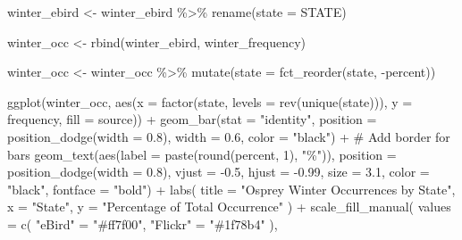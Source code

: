 \documentclass[
  letterpaper,
  DIV=11,
  numbers=noendperiod]{scrartcl}
\newenvironment{Shaded}{\begin{snugshade}}{\end{snugshade}}
\newcommand{\AttributeTok}[1]{\textcolor[rgb]{0.40,0.45,0.13}{#1}}
\newcommand{\CommentTok}[1]{\textcolor[rgb]{0.37,0.37,0.37}{#1}}
\newcommand{\DecValTok}[1]{\textcolor[rgb]{0.68,0.00,0.00}{#1}}
\newcommand{\FloatTok}[1]{\textcolor[rgb]{0.68,0.00,0.00}{#1}}
\newcommand{\FunctionTok}[1]{\textcolor[rgb]{0.28,0.35,0.67}{#1}}
\newcommand{\NormalTok}[1]{\textcolor[rgb]{0.00,0.23,0.31}{#1}}
\newcommand{\OtherTok}[1]{\textcolor[rgb]{0.00,0.23,0.31}{#1}}
\newcommand{\SpecialCharTok}[1]{\textcolor[rgb]{0.37,0.37,0.37}{#1}}
\newcommand{\StringTok}[1]{\textcolor[rgb]{0.13,0.47,0.30}{#1}}
\begin{document}
\begin{Shaded}
\begin{Highlighting}[]
\NormalTok{winter\_ebird }\OtherTok{\textless{}{-}}\NormalTok{ winter\_ebird }\SpecialCharTok{\%\textgreater{}\%}
  \FunctionTok{rename}\NormalTok{(}\AttributeTok{state =}\NormalTok{ STATE) }

\NormalTok{winter\_occ }\OtherTok{\textless{}{-}} \FunctionTok{rbind}\NormalTok{(winter\_ebird, winter\_frequency)}

\NormalTok{winter\_occ }\OtherTok{\textless{}{-}}\NormalTok{ winter\_occ }\SpecialCharTok{\%\textgreater{}\%}
  \FunctionTok{mutate}\NormalTok{(}\AttributeTok{state =} \FunctionTok{fct\_reorder}\NormalTok{(state, }\SpecialCharTok{{-}}\NormalTok{percent))}

\FunctionTok{ggplot}\NormalTok{(winter\_occ, }\FunctionTok{aes}\NormalTok{(}\AttributeTok{x =} \FunctionTok{factor}\NormalTok{(state, }\AttributeTok{levels =} \FunctionTok{rev}\NormalTok{(}\FunctionTok{unique}\NormalTok{(state))), }\AttributeTok{y =}\NormalTok{ frequency, }\AttributeTok{fill =}\NormalTok{ source)) }\SpecialCharTok{+}
  \FunctionTok{geom\_bar}\NormalTok{(}\AttributeTok{stat =} \StringTok{"identity"}\NormalTok{, }\AttributeTok{position =} \FunctionTok{position\_dodge}\NormalTok{(}\AttributeTok{width =} \FloatTok{0.8}\NormalTok{), }\AttributeTok{width =} \FloatTok{0.6}\NormalTok{, }\AttributeTok{color =} \StringTok{"black"}\NormalTok{) }\SpecialCharTok{+} \CommentTok{\# Add border for bars}
  \FunctionTok{geom\_text}\NormalTok{(}\FunctionTok{aes}\NormalTok{(}\AttributeTok{label =} \FunctionTok{paste}\NormalTok{(}\FunctionTok{round}\NormalTok{(percent, }\DecValTok{1}\NormalTok{), }\StringTok{"\%"}\NormalTok{)), }
            \AttributeTok{position =} \FunctionTok{position\_dodge}\NormalTok{(}\AttributeTok{width =} \FloatTok{0.8}\NormalTok{), }
            \AttributeTok{vjust =} \SpecialCharTok{{-}}\FloatTok{0.5}\NormalTok{, }\AttributeTok{hjust =} \SpecialCharTok{{-}}\FloatTok{0.99}\NormalTok{, }\AttributeTok{size =} \FloatTok{3.1}\NormalTok{, }\AttributeTok{color =} \StringTok{"black"}\NormalTok{, }\AttributeTok{fontface =} \StringTok{"bold"}\NormalTok{) }\SpecialCharTok{+}
  \FunctionTok{labs}\NormalTok{(}
    \AttributeTok{title =} \StringTok{"Osprey Winter Occurrences by State"}\NormalTok{,}
    \AttributeTok{x =} \StringTok{"State"}\NormalTok{,}
    \AttributeTok{y =} \StringTok{"Percentage of Total Occurrence"}
\NormalTok{  ) }\SpecialCharTok{+}
  \FunctionTok{scale\_fill\_manual}\NormalTok{(}
    \AttributeTok{values =} \FunctionTok{c}\NormalTok{( }\StringTok{"eBird"} \OtherTok{=} \StringTok{"\#ff7f00"}\NormalTok{, }\StringTok{"Flickr"} \OtherTok{=} \StringTok{"\#1f78b4"}\NormalTok{ ), }

\end{Highlighting}
\end{Shaded}
\end{document}
